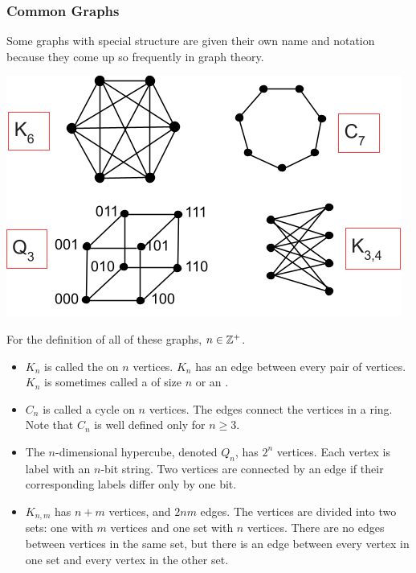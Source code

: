\subsubsection*{Common Graphs}
Some graphs with special structure are given their own name and notation because they come up so frequently in graph theory.
\begin{center}
  \includegraphics[width=0.6\linewidth]{resources/common graphs.png}
\end{center}
For the definition of all of these graphs, $n \in \mathbb{Z}^+$.
\begin{itemize}
  \item $K_n$ is called the  on $n$ vertices. $K_n$ has an edge between every pair of vertices. $K_n$ is sometimes called a  of size $n$ or an .
  \item $C_n$ is called a cycle on $n$ vertices. The edges connect the vertices in a ring. Note that $C_n$ is well defined only for $n \geq 3$.
  \item The $n$-dimensional hypercube, denoted $Q_n$, has $2^n$ vertices. Each vertex is label with an $n$-bit string. Two vertices are connected by an edge if their corresponding labels differ only by one bit.
  \item $K_{n,m}$ has $n+m$ vertices, and $2nm$ edges. The vertices are divided into two sets: one with $m$ vertices and one set with $n$ vertices. There are no edges between vertices in the same set, but there is an edge between every vertex in one set and every vertex in the other set.
\end{itemize}

